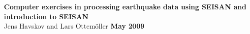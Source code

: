 
\ifx\pdfoutput\undefined %
\else
{}
\fi

\begin{titlepage}
\begin{center}
{\huge \bf{
Computer exercises in processing
earthquake data using SEISAN
and
introduction to SEISAN
}} \\[.5cm]


Jens Havskov and
Lars Ottem\"oller
\vfill
\vfill
\vfill
\vfill
\vfill
\vfill
\vfill
\vfill
\vfill
\textbf{May 2009}

\end{center}
\end{titlepage}

